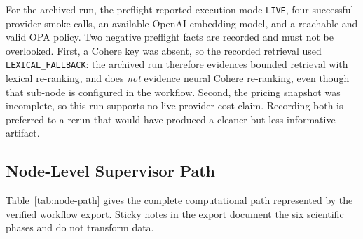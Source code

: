\documentclass[journal]{IEEEtran}
\begin{document}
For the archived run, the preflight reported execution mode \texttt{LIVE},
four successful provider smoke calls, an available OpenAI embedding model,
and a reachable and valid OPA policy. Two negative preflight facts are
recorded and must not be overlooked. First, a Cohere key was absent, so the
recorded retrieval used \texttt{LEXICAL\_FALLBACK}: the archived run therefore
evidences bounded retrieval with lexical re-ranking, and does \emph{not}
evidence neural Cohere re-ranking, even though that sub-node is configured in
the workflow. Second, the pricing snapshot was incomplete, so this run
supports no live provider-cost claim. Recording both is preferred to a rerun
that would have produced a cleaner but less informative artifact.

\subsection{Node-Level Supervisor Path}
Table~\ref{tab:node-path} gives the complete computational path represented by
the verified workflow export. Sticky notes in the export document the six
scientific phases and do not transform data.
\end{document}
